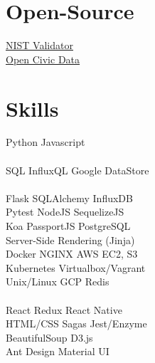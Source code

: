\documentclass[]{deedy-resume-openfont}
\begin{document}
\begin{minipage}[t]{0.31\textwidth}
\section{Open-Source}
\color{blue}\underline{\color{blue}\href{https://github.com/google/election_results_xml_validator}{NIST Validator}} \\
\color{blue}\underline{\color{blue}\href{https://github.com/opencivicdata/ocd-division-ids}{Open Civic Data}}
\sectionsep


\section{Skills}
\sectionsep

Python \textbullet{} Javascript \\
\\[1\baselineskip]

SQL \textbullet{} InfluxQL \textbullet{} Google DataStore \\
\\[1\baselineskip]

Flask \textbullet{} SQLAlchemy \textbullet{} InfluxDB \\
Pytest \textbullet{} NodeJS \textbullet{} SequelizeJS  \\
Koa \textbullet{} PassportJS \textbullet{} PostgreSQL\\
Server-Side Rendering (Jinja)
\\[1\baselineskip]

Docker \textbullet{} NGINX \textbullet{} AWS EC2, S3 \\
Kubernetes \textbullet{} Virtualbox/Vagrant \\
Unix/Linux \textbullet{} GCP \textbullet{} Redis\\
\\[1\baselineskip]

React \textbullet{} Redux \textbullet{} React Native \\
 HTML/CSS \textbullet{} Sagas \textbullet{} Jest/Enzyme \\
 BeautifulSoup \textbullet{} D3.js \\
 Ant Design \textbullet{} Material UI \\
\\[1\baselineskip]

%
%

\end{minipage}
\end{document}
